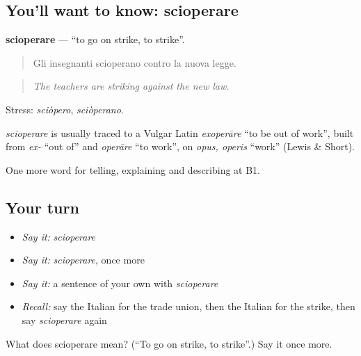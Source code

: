 \subsection*{You'll want to know: scioperare}
\textbf{scioperare} — \textquotedblleft{}to go on strike, to strike\textquotedblright{}.

\begin{quote}
Gli insegnanti scioperano contro la nuova legge.
\end{quote}

\begin{quote}
\emph{The teachers are striking against the new law.}
\end{quote}

Stress: \emph{sciòpero}, \emph{sciòperano}.

\begin{cousinweb}
\emph{scioperare} is usually traced to a Vulgar Latin \emph{exoperāre} \textquotedblleft{}to be out of work\textquotedblright{}, built from \emph{ex-} \textquotedblleft{}out of\textquotedblright{} and \emph{operāre} \textquotedblleft{}to work\textquotedblright{}, on \emph{opus, operis} \textquotedblleft{}work\textquotedblright{} (Lewis \& Short).
\end{cousinweb}

\begin{grammarlens}[title={What you've built}]
One more word for telling, explaining and describing at B1.
\end{grammarlens}

\subsection*{Your turn}
\begin{itemize}
\raggedright
  \item \emph{Say it:} \emph{scioperare}
  \item \emph{Say it:} \emph{scioperare}, once more
  \item \emph{Say it:} a sentence of your own with \emph{scioperare}
  \item \emph{Recall:} say the Italian for the trade union, then the Italian for the strike, then say \emph{scioperare} again
\end{itemize}

\begin{tcolorbox}[breakable,colback=teal!4,colframe=teal!35!black,title={Before you move on}]
What does scioperare mean? (\textquotedblleft{}To go on strike, to strike\textquotedblright{}.) Say it once more.
\end{tcolorbox}
